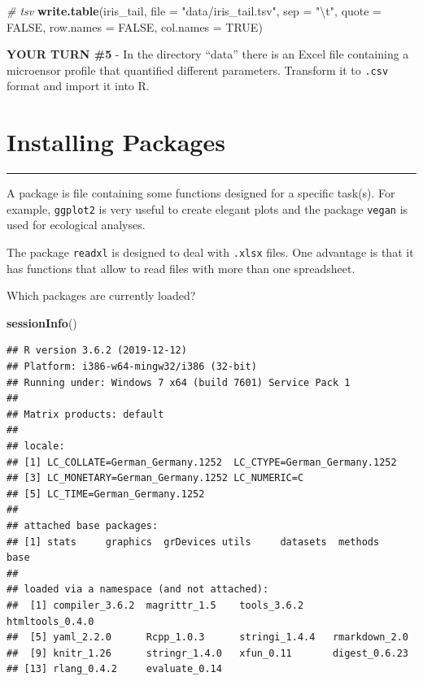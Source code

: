 \documentclass[
]{article}
\newenvironment{Shaded}{\begin{snugshade}}{\end{snugshade}}
\newcommand{\CharTok}[1]{\textcolor[rgb]{0.31,0.60,0.02}{#1}}
\newcommand{\CommentTok}[1]{\textcolor[rgb]{0.56,0.35,0.01}{\textit{#1}}}
\newcommand{\DataTypeTok}[1]{\textcolor[rgb]{0.13,0.29,0.53}{#1}}
\newcommand{\KeywordTok}[1]{\textcolor[rgb]{0.13,0.29,0.53}{\textbf{#1}}}
\newcommand{\NormalTok}[1]{#1}
\newcommand{\OtherTok}[1]{\textcolor[rgb]{0.56,0.35,0.01}{#1}}
\newcommand{\StringTok}[1]{\textcolor[rgb]{0.31,0.60,0.02}{#1}}
\begin{document}
\begin{Shaded}
\begin{Highlighting}[]
\CommentTok{# tsv}
\KeywordTok{write.table}\NormalTok{(iris_tail, }\DataTypeTok{file =} \StringTok{"data/iris_tail.tsv"}\NormalTok{, }\DataTypeTok{sep =} \StringTok{"}\CharTok{\textbackslash{}t}\StringTok{"}\NormalTok{, }\DataTypeTok{quote =} \OtherTok{FALSE}\NormalTok{, }\DataTypeTok{row.names =} \OtherTok{FALSE}\NormalTok{, }\DataTypeTok{col.names =} \OtherTok{TRUE}\NormalTok{)}
\end{Highlighting}
\end{Shaded}

\textbf{YOUR TURN \#5} - In the directory ``data'' there is an Excel
file containing a microensor profile that quantified different
parameters. Transform it to \texttt{.csv} format and import it into R.

\hypertarget{installing-packages}{%
\section{Installing Packages}\label{installing-packages}}

\begin{center}\rule{0.5\linewidth}{\linethickness}\end{center}

A package is file containing some functions designed for a specific
task(s). For example, \texttt{ggplot2} is very useful to create elegant
plots and the package \texttt{vegan} is used for ecological analyses.

The package \texttt{readxl} is designed to deal with \texttt{.xlsx}
files. One advantage is that it has functions that allow to read files
with more than one spreadsheet.

Which packages are currently loaded?

\begin{Shaded}
\begin{Highlighting}[]
\KeywordTok{sessionInfo}\NormalTok{()}
\end{Highlighting}
\end{Shaded}

\begin{verbatim}
## R version 3.6.2 (2019-12-12)
## Platform: i386-w64-mingw32/i386 (32-bit)
## Running under: Windows 7 x64 (build 7601) Service Pack 1
## 
## Matrix products: default
## 
## locale:
## [1] LC_COLLATE=German_Germany.1252  LC_CTYPE=German_Germany.1252   
## [3] LC_MONETARY=German_Germany.1252 LC_NUMERIC=C                   
## [5] LC_TIME=German_Germany.1252    
## 
## attached base packages:
## [1] stats     graphics  grDevices utils     datasets  methods   base     
## 
## loaded via a namespace (and not attached):
##  [1] compiler_3.6.2  magrittr_1.5    tools_3.6.2     htmltools_0.4.0
##  [5] yaml_2.2.0      Rcpp_1.0.3      stringi_1.4.4   rmarkdown_2.0  
##  [9] knitr_1.26      stringr_1.4.0   xfun_0.11       digest_0.6.23  
## [13] rlang_0.4.2     evaluate_0.14
\end{verbatim}
\end{document}
